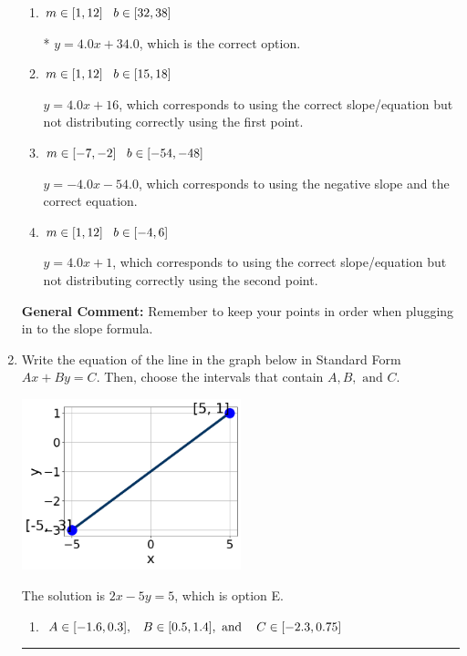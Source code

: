 \documentclass{extbook}[14pt]
\newcommand{\litem}[1]{\item #1

\rule{\textwidth}{0.4pt}}
\begin{document}
\begin{enumerate}
{\begin{enumerate}[label=\Alph*.]
 $y = 4.0x -34.0$, which corresponds to using the correct slope and getting the negative y-intercept.
\item \( m \in [1, 12] \hspace*{3mm} b \in [32, 38] \)

* $y = 4.0x + 34.0$, which is the correct option.
\item \( m \in [1, 12] \hspace*{3mm} b \in [15, 18] \)

 $y = 4.0x + 16$, which corresponds to using the correct slope/equation but not distributing correctly using the first point.
\item \( m \in [-7, -2] \hspace*{3mm} b \in [-54, -48] \)

 $y = -4.0x -54.0$, which corresponds to using the negative slope and the correct equation.
\item \( m \in [1, 12] \hspace*{3mm} b \in [-4, 6] \)

 $y = 4.0x + 1$, which corresponds to using the correct slope/equation but not distributing correctly using the second point.
\end{enumerate}

\textbf{General Comment:} Remember to keep your points in order when plugging in to the slope formula.
}
\litem{
Write the equation of the line in the graph below in Standard Form $Ax+By=C$. Then, choose the intervals that contain $A, B, \text{ and } C$.

\begin{center}
    \includegraphics[width=0.5\textwidth]{../Figures/linearGraphToStandardA.png}
\end{center}


The solution is \( 2x - 5y = 5 \), which is option E.\begin{enumerate}[label=\Alph*.]
\item \( A \in [-1.6, 0.3], \hspace{3mm} B \in [0.5, 1.4], \text{ and } \hspace{3mm} C \in [-2.3, 0.75] \)


\end{enumerate}}
\end{enumerate}
\end{document}
